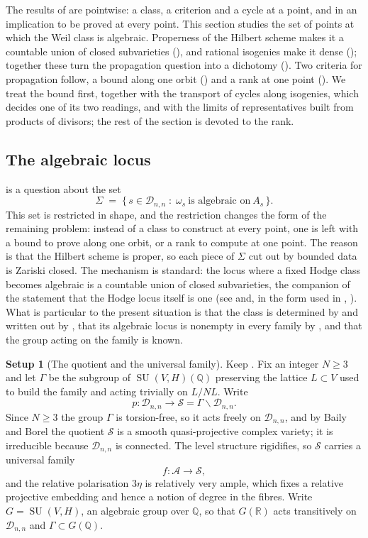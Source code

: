 \documentclass[11pt,reqno]{amsart}
\theoremstyle{plain}
\theoremstyle{definition}
\newtheorem{setupenv}[theorem]{Setup}
\theoremstyle{remark}
\newcommand{\QQ}{\mathbb{Q}}
\newcommand{\RR}{\mathbb{R}}
\newcommand{\cA}{\mathcal{A}}
\newcommand{\cD}{\mathcal{D}}
\newcommand{\cS}{\mathcal{S}}
\DeclareMathOperator{\SU}{SU}
\begin{document}
The results of  are pointwise: a class, a criterion and
a cycle at a point, and in  an implication to be proved
at every point. This section studies the set of points at which the Weil class
is algebraic. Properness of the Hilbert scheme makes it a countable union of
closed subvarieties (), and rational isogenies make it
dense (); together these turn the propagation question
into a dichotomy (). Two criteria for propagation
follow, a bound along one orbit () and a rank at one
point (\cite[Theorem~2.3]{paperII}). We treat the bound first, together with
the transport of cycles along isogenies, which decides one of its two
readings, and with the limits of representatives built from products of
divisors; the rest of the section is devoted to the rank.

\subsection{The algebraic locus}
\label{ssec:properness}

 is a question about the set
\[
  \Sigma \;=\; \bigl\{\,s\in\cD_{n,n} \;:\;
    \omega_{s}\ \text{is algebraic on}\ A_{s}\,\bigr\}.
\]
This set is restricted in shape, and the restriction changes the form
of the remaining problem: instead of a class to construct at every point, one
is left with a bound to prove along one orbit, or a rank to compute at one
point. The reason is that the Hilbert scheme is proper, so each piece of
$\Sigma$ cut out by bounded data is Zariski closed. The mechanism is standard:
the locus where a fixed Hodge class becomes algebraic is a countable union of
closed subvarieties, the companion of the statement that the Hodge locus
itself is one (see \cite[Chapter~5]{Voi03} and, in the form used in
, \cite{CDK95}). What is particular to the present situation is
that the class is determined by  and written out by
, that its algebraic locus is nonempty in every family
by , and that the group acting on the family is known.

\begin{setupenv}[The quotient and the universal family]\label{setup:shimura}
Keep . Fix an integer $N\ge3$ and let $\Gamma$ be the
subgroup of $\SU(V,H)(\QQ)$ preserving the lattice $L\subset V$ used to build
the family and acting trivially on $L/NL$. Write
\[
  p\colon\cD_{n,n}\longrightarrow\cS=\Gamma\backslash\cD_{n,n} .
\]
Since $N\ge3$ the group $\Gamma$ is torsion-free, so it acts freely on
$\cD_{n,n}$, and by Baily and Borel \cite{BB66} the quotient $\cS$ is a smooth
quasi-projective complex variety; it is irreducible because $\cD_{n,n}$ is
connected. The level structure rigidifies, so $\cS$ carries a universal family
\[
  f\colon\cA\longrightarrow\cS,
\]
and the relative polarisation $3\eta$ is relatively very ample, which fixes a
relative projective embedding and hence a notion of degree in the fibres.
Write $G=\SU(V,H)$, an algebraic group over $\QQ$, so that
$G(\RR)$ acts transitively on $\cD_{n,n}$ and $\Gamma\subset G(\QQ)$.
\end{setupenv}
\end{document}
